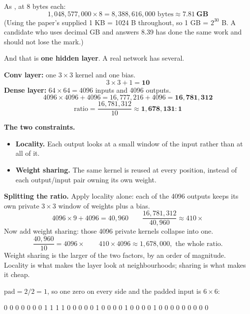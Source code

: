 As , at 8 bytes each:
\[
  1{,}048{,}577{,}000 \times 8 = 8{,}388{,}616{,}000 \text{ bytes} \approx \mathbf{7.81\ GB}
\]
(Using the paper's supplied 1 KB = 1024 B throughout, so 1 GB = $2^{30}$ B. A candidate who uses
decimal GB and answers 8.39 has done the same work and should not lose the mark.)

And that is \textbf{one hidden layer}. A real network has several. 

\textbf{Conv layer:} one $3 \times 3$ kernel and one bias.
\[
  3 \times 3 + 1 = \mathbf{10}
\]
\textbf{Dense layer:} $64 \times 64 = 4096$ inputs and 4096 outputs.
\[
  4096 \times 4096 + 4096 = 16{,}777{,}216 + 4096 = \mathbf{16{,}781{,}312}
\]
\[
  \text{ratio} = \frac{16{,}781{,}312}{10} \approx \mathbf{1{,}678{,}131 : 1}
\]

\textbf{The two constraints.}
\begin{itemize}
  \item \textbf{Locality.} Each output looks at a small window of the input rather than at all of it.
  \item \textbf{Weight sharing.} The same kernel is reused at every position, instead of each
    output/input pair owning its own weight.
\end{itemize}

\textbf{Splitting the ratio.} Apply locality alone: each of the 4096 outputs keeps its own private
$3 \times 3$ window of weights plus a bias.
\[
  4096 \times 9 + 4096 = 40{,}960 \qquad \frac{16{,}781{,}312}{40{,}960} \approx 410\times
\]
Now add weight sharing: those 4096 private kernels collapse into one.
\[
  \frac{40{,}960}{10} = 4096\times \qquad 410 \times 4096 \approx 1{,}678{,}000,
  \text{ the whole ratio.}
\]
Weight sharing is the larger of the two factors, by an order of magnitude. Locality is what makes the
layer look at neighbourhoods; sharing is what makes it cheap. 


$\text{pad} = 2 / 2 = 1$, so one zero on every side and the padded input is $6 \times 6$:

\begin{console}
0 0 0 0 0 0
0 1 1 1 1 0
0 0 0 0 1 0
0 0 0 1 0 0
0 0 1 0 0 0
0 0 0 0 0 0
\end{console}

